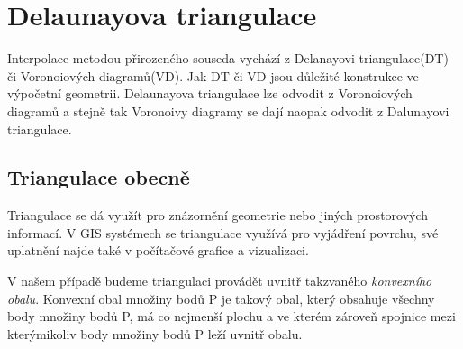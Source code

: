 \documentclass[12pt,a4paper]{article}
\begin{document}
\newpage
\section{Delaunayova triangulace}
Interpolace metodou přirozeného souseda vychází z Delanayovi triangulace(DT) či Voronoiových diagramů(VD). Jak DT či VD jsou důležité konstrukce ve výpočetní geometrii. Delaunayova triangulace lze odvodit z Voronoiových diagramů a stejně tak Voronoivy diagramy se dají naopak odvodit z Dalunayovi triangulace.

\subsection{Triangulace obecně}
Triangulace se dá využít pro znázornění geometrie nebo jiných prostorových informací. V GIS systémech se triangulace využívá pro vyjádření povrchu, své uplatnění najde také v počítačové grafice a vizualizaci.

V našem případě budeme triangulaci provádět uvnitř takzvaného \textit{konvexního obalu}. Konvexní obal množiny bodů P je takový obal, který obsahuje všechny body množiny bodů P, má co nejmenší plochu a ve kterém zároveň spojnice mezi kterýmikoliv body množiny bodů P leží uvnitř obalu.

\begin{figure}[h!]
\centering
\begin{floatrow}
\end{floatrow}
\end{figure}
\end{document}
